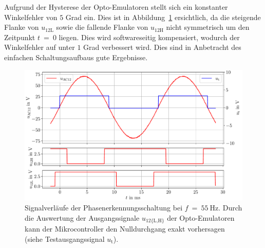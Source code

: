 \documentclass[a4paper,12pt]{article}
\begin{document}
Aufgrund der Hysterese der Opto-Emulatoren stellt sich ein konstanter Winkelfehler von $5$ Grad ein. Dies ist in Abbildung~\ref{fig:InGridSync} ersichtlich, da die steigende Flanke von  $u_\text{12L}$ sowie die fallende Flanke von $u_\text{12H}$ nicht symmetrisch um den Zeitpunkt $t~=~0$ liegen. Dies wird softwareseitig kompensiert, wodurch der Winkelfehler auf unter $1$ Grad verbessert wird. Dies sind in Anbetracht des einfachen Schaltungsaufbaus gute Ergebnisse.

\begin{figure}[ht]
    \footnotesize
    \centering
    \includegraphics[width=0.95\linewidth]{IbGridSync}
    \caption{Signalverläufe der Phasenerkennungsschaltung bei $f~=~55~\text{Hz}$. Durch die Auswertung der Ausgangssignale $u_\text{12\{L,H\}}$ der Opto-Emulatoren kann der Mikrocontroller den Nulldurchgang exakt vorhersagen (siehe Testausgangssignal $u_\text{t}$).}	
    \label{fig:InGridSync}
\end{figure}
\end{document}
